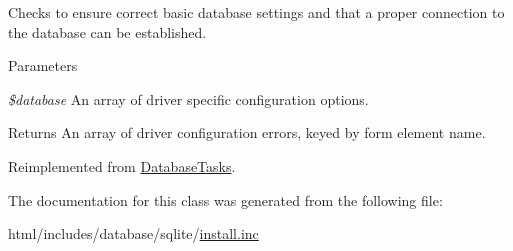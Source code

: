 Checks to ensure correct basic database settings and that a proper connection to the database can be established.


\begin{DoxyParams}{Parameters}
\item[{\em \$database}]An array of driver specific configuration options.\end{DoxyParams}
\begin{DoxyReturn}{Returns}
An array of driver configuration errors, keyed by form element name. 
\end{DoxyReturn}


Reimplemented from \hyperlink{classDatabaseTasks_a44116b4f564f8fcfdd5ade73853419b8}{DatabaseTasks}.

The documentation for this class was generated from the following file:\begin{DoxyCompactItemize}
\item 
html/includes/database/sqlite/\hyperlink{database_2sqlite_2install_8inc}{install.inc}\end{DoxyCompactItemize}
